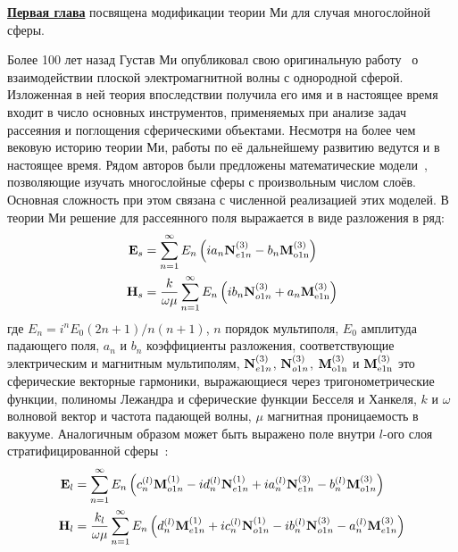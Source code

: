 \underline{\textbf{Первая глава}} посвящена модификации теории Ми для
случая многослойной сферы. 

Более 100 лет назад Густав Ми опубликовал свою оригинальную
работу~\cite{Mie-1908} о взаимодействии плоской электромагнитной волны
с однородной сферой.  Изложенная в ней теория впоследствии получила
его имя и в настоящее время входит в число основных инструментов,
применяемых при анализе задач рассеяния и поглощения сферическими
объектами.  Несмотря на более чем вековую историю теории Ми, работы по
её дальнейшему развитию ведутся и в настоящее время. %
Рядом авторов были предложены математические
модели~\cite{Yang-2003, Pena-scattnlay-2009}, позволяющие изучать
многослойные сферы с произвольным числом слоёв.  Основная сложность
при этом связана с численной реализацией этих моделей.  В теории Ми
решение для рассеянного поля выражается в виде разложения в ряд:
\begin{align*}
{\rm \mathbf{E}}_s &=\sum_{n=1}^{\infty} E_n \left( i a_n {\rm
    \mathbf{N}}_{e1n}^{(3)} - b_n{\rm\mathbf{M}_{o1n}^{(3)}} \right)\\
{\rm \mathbf{H}}_s &=\frac{k}{\omega\mu}
 \sum_{n=1}^{\infty} E_n \left( i b_n {\rm
    \mathbf{N}}_{o1n}^{(3)} + a_n{\rm\mathbf{M}_{e1n}^{(3)}} \right)  
\end{align*}
где $E_n=i^nE_0(2n+1)/n(n+1)$, $n$ порядок мультиполя, $E_0$ амплитуда
падающего поля, $a_n$ и $b_n$ коэффициенты разложения, соответствующие
электрическим и магнитным мультиполям, ${\rm \mathbf{N}}_{e1n}^{(3)}$,
${\rm \mathbf{N}}_{o1n}^{(3)}$, ${\rm\mathbf{M}_{o1n}^{(3)}}$ и
${\rm\mathbf{M}_{e1n}^{(3)}}$ это сферические векторные гармоники,
выражающиеся через тригонометрические функции, полиномы Лежандра и
сферические функции Бесселя и Ханкеля, $k$ и $\omega$ волновой вектор
и частота падающей волны, $\mu$ магнитная проницаемость в вакууме.
Аналогичным образом может быть выражено поле внутри $l$-ого слоя
стратифицированной сферы~\cite{Yang-2003}:
\begin{align}
{\rm \mathbf{E}}_l &=\sum_{n=1}^{\infty} E_n \left(
                     c_n^{(l)}{\rm\mathbf{M}}_{o1n}^{(1)}
                     -i d_n^{(l)} {\rm \mathbf{N}}_{e1n}^{(1)}
                     +i a_n^{(l)} {\rm \mathbf{N}}_{e1n}^{(3)}
                     - b_n^{(l)}{\rm\mathbf{M}}_{o1n}^{(3)} 
                     \right)\label{eq:3p1}\\
{\rm \mathbf{H}}_l &=\frac{k_l}{\omega\mu} \sum_{n=1}^{\infty} E_n
                     \left(
                      d_n^{(l)}{\rm\mathbf{M}}_{e1n}^{(1)} 
                     +i c_n^{(l)} {\rm \mathbf{N}}_{o1n}^{(1)} 
                     -i b_n^{(l)} {\rm \mathbf{N}}_{o1n}^{(3)} 
                     - a_n^{(l)}{\rm\mathbf{M}}_{e1n}^{(3)} 
                     \right)\label{eq:3p2}  
\end{align}
